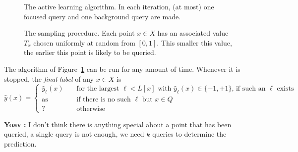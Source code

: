 \documentclass[anon,12pt]{colt2022} %
\def\yh{{\widehat{y}}}
\newcommand{\comment}[3]{{\color{#1} {\bf #2 :} #3}}
\newcommand{\yoav}[1]{\comment{blue}{Yoav}{#1}}
\begin{document}
\begin{figure}[h!]
{\begin{minipage}[t]{5.9in}
\begin{itemize}
\end{itemize}

\end{minipage}}
\caption{The active learning algorithm. In each iteration, (at most) one focused query and one background query are made.}
\label{alg:main}
\end{figure}



\begin{figure}[h!]
\caption{The sampling procedure. Each point $x \in X$ has an associated value $T_x$ chosen uniformly at random from $[0,1]$. This smaller this value, the earlier this point is likely to be queried.} 
\label{alg:sampling}
\end{figure}

The algorithm of Figure~\ref{alg:main} can be run for any amount of time. Whenever it is stopped, the {\it final label} of any $x \in X$ is
\begin{equation}
\yh(x) = 
\left\{
\begin{array}{ll}
\yh_\ell(x) & \mbox{for the largest $\ell < L[x]$ with $\yh_\ell(x) \in \{-1,+1\}$, if such an $\ell$ exists} \\
\mbox{as queried} & \mbox{if there is no such $\ell$ but $x \in Q$} \\
? & \mbox{otherwise}
\end{array}
\right.
\label{eq:final-label}
\end{equation}

\yoav{I don't think there is anything special about a point that has
  been queried, a single query is not enough, we need $k$ queries to
  determine the prediction.}
\end{document}
